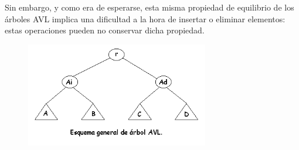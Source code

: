Sin embargo, y como era de esperarse, esta misma propiedad de equilibrio de los árboles AVL implica una dificultad a la hora de insertar o eliminar elementos: estas operaciones pueden no conservar dicha propiedad.

\begin{figure}[h]
\centering
    \includegraphics[width=8cm]{imagen_5.png}
\end{figure}